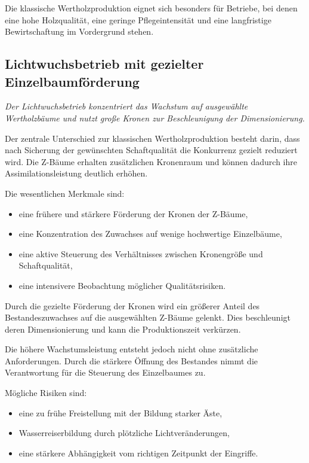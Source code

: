 \documentclass[twocolumn, bibliography=totoc, abstract=true]{scrartcl}
\begin{document}
Die klassische Wertholzproduktion eignet sich besonders für Betriebe, bei denen eine hohe Holzqualität, eine geringe Pflegeintensität und eine langfristige Bewirtschaftung im Vordergrund stehen.

\subsection{Lichtwuchsbetrieb mit gezielter Einzelbaumförderung}

\emph{Der Lichtwuchsbetrieb konzentriert das Wachstum auf ausgewählte Wertholzbäume und nutzt große Kronen zur Beschleunigung der Dimensionierung.}

Der zentrale Unterschied zur klassischen Wertholzproduktion besteht darin, dass nach Sicherung der gewünschten Schaftqualität die Konkurrenz gezielt reduziert wird. Die Z-Bäume erhalten zusätzlichen Kronenraum und können dadurch ihre Assimilationsleistung deutlich erhöhen.

Die wesentlichen Merkmale sind:

\begin{itemize}
\item eine frühere und stärkere Förderung der Kronen der Z-Bäume,
\item eine Konzentration des Zuwachses auf wenige hochwertige Einzelbäume,
\item eine aktive Steuerung des Verhältnisses zwischen Kronengröße und Schaftqualität,
\item eine intensivere Beobachtung möglicher Qualitätsrisiken.
\end{itemize}

Durch die gezielte Förderung der Kronen wird ein größerer Anteil des Bestandeszuwachses auf die ausgewählten Z-Bäume gelenkt. Dies beschleunigt deren Dimensionierung und kann die Produktionszeit verkürzen.

Die höhere Wachstumsleistung entsteht jedoch nicht ohne zusätzliche Anforderungen. Durch die stärkere Öffnung des Bestandes nimmt die Verantwortung für die Steuerung des Einzelbaumes zu.

Mögliche Risiken sind:

\begin{itemize}
\item eine zu frühe Freistellung mit der Bildung starker Äste,
\item Wasserreiserbildung durch plötzliche Lichtveränderungen,
\item eine stärkere Abhängigkeit vom richtigen Zeitpunkt der Eingriffe.
\end{itemize}
\end{document}
